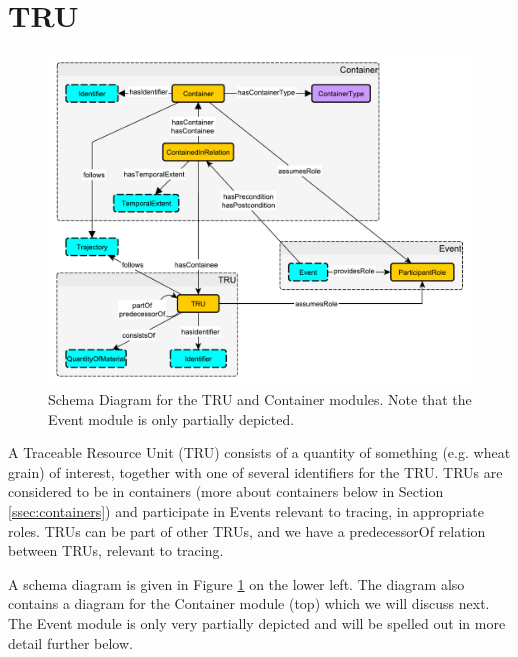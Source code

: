 \section{TRU}
\label{ssec:tru}
\begin{figure}[h!]
\begin{center}
\includegraphics[width=.9\textwidth]{diagrams/tru}
\end{center}
\caption{Schema Diagram for the TRU and Container modules. Note that the Event module is only partially depicted.}
\label{fig:tru}
\end{figure}
A Traceable Resource Unit (TRU) consists of a quantity of something (e.g. wheat grain) of interest, together with one of several identifiers for the TRU. TRUs are considered to be in containers (more about containers below in Section \ref{ssec:containers}) and participate in Events relevant to tracing, in appropriate roles. TRUs can be part of other TRUs, and we have a predecessorOf relation between TRUs, relevant to tracing.

A schema diagram is given in Figure \ref{fig:tru} on the lower left. The diagram also contains a diagram for the Container module (top) which we will discuss next. The Event module is only very partially depicted and will be spelled out in more detail further below.

